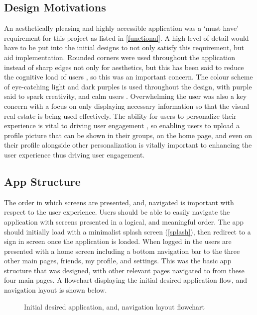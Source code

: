 \subsection*{Design Motivations}
An aesthetically pleasing and highly accessible application was a `must have' requirement for this project as listed in \ref{functional}. A high level of detail would have to be put into the initial designs to not only satisfy this requirement, but aid implementation. Rounded corners were used throughout the application instead of sharp edges not only for aesthetics, but this has been said to reduce the cognitive load of users \cite{roundedCorners}, so this was an important concern. The colour scheme of eye-catching light and dark purples is used throughout the design, with purple said to spark creativity, and calm users \cite{purplePsych}. Overwhelming the user was also a key concern with a focus on only displaying necessary information so that the visual real estate is being used effectively. The ability for users to personalize their experience is vital to driving user engagement \cite{customUserEng}, so enabling users to upload a profile picture that can be shown in their groups, on the home page, and even on their profile alongside other personalization is vitally important to enhancing the user experience thus driving user engagement. 

\subsection*{App Structure}
The order in which screens are presented, and, navigated is important with respect to the user experience. Users should be able to easily navigate the application with screens presented in a logical, and meaningful order. The app should initially load with a minimalist splash screen (\ref{splash}), then redirect to a sign in screen once the application is loaded. When logged in the users are presented with a home screen including a bottom navigation bar to the three other main pages, friends, my profile, and settings. This was the basic app structure that was designed, with other relevant pages navigated to from these four main pages. A flowchart displaying the initial desired application flow, and navigation layout is shown below. 

\begin{figure}[!htbp]
    \centering
    \begin{subfigure}[b]{0.6\textwidth}
    \end{subfigure}
    \caption{Initial desired application, and, navigation layout flowchart} 
    \label{fig:layoutFlow}
\end{figure}
\FloatBarrier

